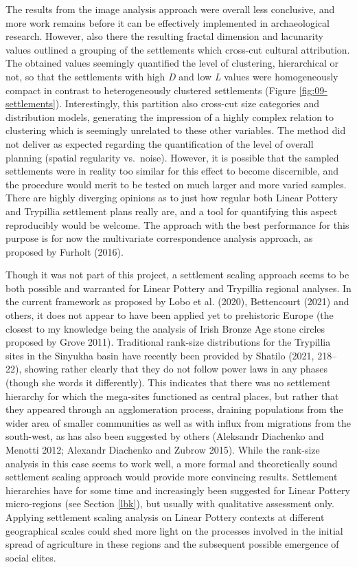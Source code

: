 \documentclass[
  12pt,
  a4paper, twoside]{book}
\begin{document}
The results from the image analysis approach were overall less conclusive, and more work remains before it can be effectively implemented in archaeological research. However, also there the resulting fractal dimension and lacunarity values outlined a grouping of the settlements which cross-cut cultural attribution. The obtained values seemingly quantified the level of clustering, hierarchical or not, so that the settlements with high \emph{D} and low \emph{L} values were homogeneously compact in contrast to heterogeneously clustered settlements (Figure \ref{fig:09-settlements}). Interestingly, this partition also cross-cut size categories and distribution models, generating the impression of a highly complex relation to clustering which is seemingly unrelated to these other variables. The method did not deliver as expected regarding the quantification of the level of overall planning (spatial regularity vs.~noise). However, it is possible that the sampled settlements were in reality too similar for this effect to become discernible, and the procedure would merit to be tested on much larger and more varied samples. There are highly diverging opinions as to just how regular both Linear Pottery and Trypillia settlement plans really are, and a tool for quantifying this aspect reproducibly would be welcome. The approach with the best performance for this purpose is for now the multivariate correspondence analysis approach, as proposed by Furholt (2016).

Though it was not part of this project, a settlement scaling approach seems to be both possible and warranted for Linear Pottery and Trypillia regional analyses. In the current framework as proposed by Lobo et al. (2020), Bettencourt (2021) and others, it does not appear to have been applied yet to prehistoric Europe (the closest to my knowledge being the analysis of Irish Bronze Age stone circles proposed by Grove 2011). Traditional rank-size distributions for the Trypillia sites in the Sinyukha basin have recently been provided by Shatilo (2021, 218--22), showing rather clearly that they do not follow power laws in any phases (though she words it differently). This indicates that there was no settlement hierarchy for which the mega-sites functioned as central places, but rather that they appeared through an agglomeration process, draining populations from the wider area of smaller communities as well as with influx from migrations from the south-west, as has also been suggested by others (Aleksandr Diachenko and Menotti 2012; Alexandr Diachenko and Zubrow 2015). While the rank-size analysis in this case seems to work well, a more formal and theoretically sound settlement scaling approach would provide more convincing results. Settlement hierarchies have for some time and increasingly been suggested for Linear Pottery micro-regions (see Section \ref{lbk}), but usually with qualitative assessment only. Applying settlement scaling analysis on Linear Pottery contexts at different geographical scales could shed more light on the processes involved in the initial spread of agriculture in these regions and the subsequent possible emergence of social elites.
\end{document}
